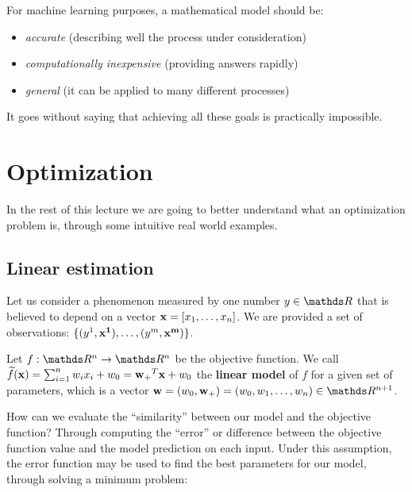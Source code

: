 \documentclass[computationalMathematics.tex]{subfiles}
\begin{document}
\noindent For machine learning purposes, a mathematical model should be:
\begin{itemize}
    \item \emph{accurate} (describing well the process under consideration)
    \item \emph{computationally inexpensive} (providing answers rapidly)
    \item \emph{general} (it can be applied to many different processes)
\end{itemize}

It goes without saying that achieving all these goals is practically impossible.

\section{Optimization}

In the rest of this lecture we are going to better understand what an optimization problem is, through some intuitive real world examples.



\subsection{Linear estimation}
Let us consider a phenomenon measured by one number $y \in \R$ that is believed to depend on a vector ${\bf x } = [x_1, \dots, x_n]$. We are provided a set of observations: $\{(y^1,{\bf x^1 }), \dots, (y^m,{\bf x^m })\}$.

\begin{definition}
  Let $f: \R^n \to \R^n$ be the objective function. We call $\widetilde{f}({\bf x }) = \sum_{i = 1}^n w_i x_i + w_0 = {{\bf w }_+}^{T} {\bf x } + w_0$ the \textbf{linear model} of $f$ for a given set of parameters, which is a vector $\vect{w} = (w_0, \vect{w}_+) = (w_0, w_1, \ldots, w_n) \in \R^{n+1}$.
\end{definition}

How can we evaluate the ``similarity'' between our model and the objective function?
Through computing the ``error'' or difference between the objective function value and the model prediction on each input.
Under this assumption, the error function may be used to find the best parameters for our model, through solving a minimum problem:
\end{document}
